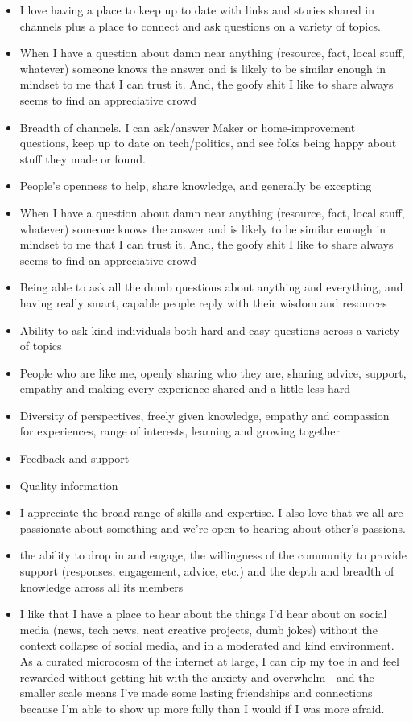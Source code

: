 \documentclass[
]{book}
\providecommand{\tightlist}{%
  \setlength{\itemsep}{0pt}\setlength{\parskip}{0pt}}
\begin{document}
\begin{itemize}
\tightlist
\item
  I love having a place to keep up to date with links and stories shared in channels plus a place to connect and ask questions on a variety of topics.
\item
  When I have a question about damn near anything (resource, fact, local stuff, whatever) someone knows the answer and is likely to be similar enough in mindset to me that I can trust it. And, the goofy shit I like to share always seems to find an appreciative crowd
\item
  Breadth of channels. I can ask/answer Maker or home-improvement questions, keep up to date on tech/politics, and see folks being happy about stuff they made or found.
\item
  People's openness to help, share knowledge, and generally be excepting
\item
  When I have a question about damn near anything (resource, fact, local stuff, whatever) someone knows the answer and is likely to be similar enough in mindset to me that I can trust it. And, the goofy shit I like to share always seems to find an appreciative crowd
\item
  Being able to ask all the dumb questions about anything and everything, and having really smart, capable people reply with their wisdom and resources
\item
  Ability to ask kind individuals both hard and easy questions across a variety of topics
\item
  People who are like me, openly sharing who they are, sharing advice, support, empathy and making every experience shared and a little less hard
\item
  Diversity of perspectives, freely given knowledge, empathy and compassion for experiences, range of interests, learning and growing together
\item
  Feedback and support
\item
  Quality information
\item
  I appreciate the broad range of skills and expertise. I also love that we all are passionate about something and we're open to hearing about other's passions.
\item
  the ability to drop in and engage, the willingness of the community to provide support (responses, engagement, advice, etc.) and the depth and breadth of knowledge across all its members
\item
  I like that I have a place to hear about the things I'd hear about on social media (news, tech news, neat creative projects, dumb jokes) without the context collapse of social media, and in a moderated and kind environment. As a curated microcosm of the internet at large, I can dip my toe in and feel rewarded without getting hit with the anxiety and overwhelm - and the smaller scale means I've made some lasting friendships and connections because I'm able to show up more fully than I would if I was more afraid.

\end{itemize}
\end{document}
